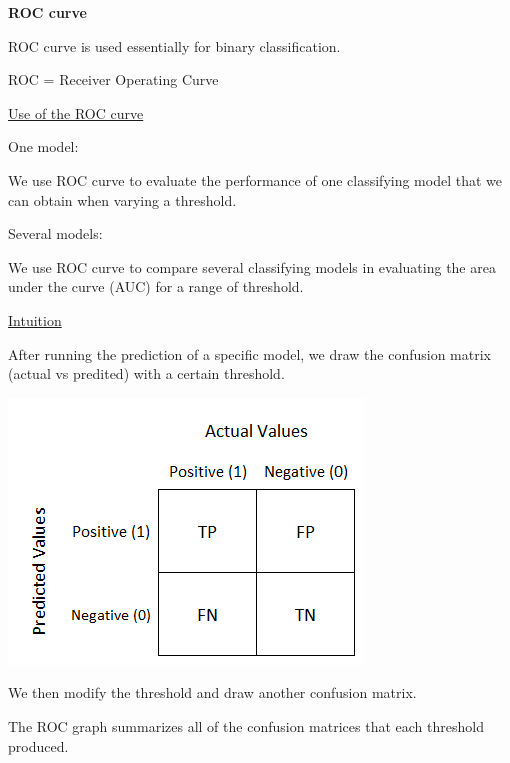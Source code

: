 {\fontsize{12pt}{22pt} \textbf{ROC curve}\par}

\vspace{5mm}

ROC curve is used essentially for binary classification.

ROC = Receiver Operating Curve

\vspace{5mm}

\underline{Use of the ROC curve}

\vspace{5mm}

One model:

We use ROC curve to evaluate the performance of one classifying model that we can obtain when varying a threshold.

\vspace{5mm}

Several models:

We use ROC curve to compare several classifying models in evaluating the area under the curve (AUC) for a range of threshold.

\vspace{5mm}

\underline{Intuition}

\vspace{5mm}

After running the prediction of a specific model, we draw the confusion matrix (actual vs predited) with a certain threshold.

\includegraphics[scale=0.5]{../images/confusionmatrice.png}

\vspace{5mm}

We then modify the threshold and draw another confusion matrix.

The ROC graph summarizes all of the confusion matrices that each threshold produced.

